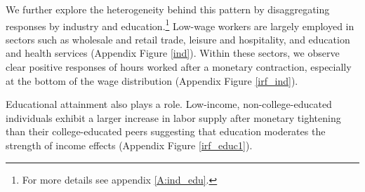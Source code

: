 \documentclass[a4paper,12pt]{article}%
\begin{document}

We further explore the heterogeneity behind this pattern by disaggregating responses by industry and education.\footnote{For more details see appendix \ref{A:ind_edu}.} Low-wage workers are largely employed in sectors such as wholesale and retail trade, leisure and hospitality, and education and health services (Appendix Figure \ref{ind}). Within these sectors, we observe clear positive responses of hours worked after a monetary contraction, especially at the bottom of the wage distribution (Appendix Figure \ref{irf_ind}).

Educational attainment also plays a role. Low-income, non-college-educated individuals exhibit a larger increase in labor supply after monetary tightening than their college-educated peers suggesting that education moderates the strength of income effects (Appendix Figure \ref{irf_educ1}).





\end{document}
